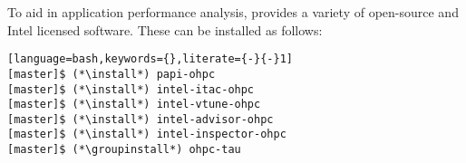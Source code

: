 To aid in application performance analysis, \OHPC{} provides a variety of
open-source and Intel licensed software. These can be installed as follows:

\begin{lstlisting}[language=bash,keywords={},literate={-}{-}1]
[master]$ (*\install*) papi-ohpc
[master]$ (*\install*) intel-itac-ohpc
[master]$ (*\install*) intel-vtune-ohpc
[master]$ (*\install*) intel-advisor-ohpc
[master]$ (*\install*) intel-inspector-ohpc
[master]$ (*\groupinstall*) ohpc-tau
\end{lstlisting}
